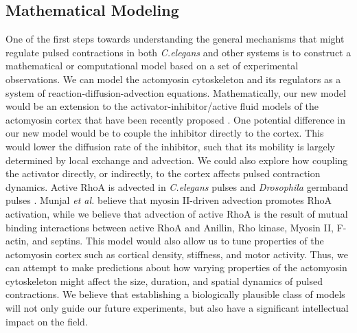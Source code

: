\documentclass{ucetd}
\begin{document}
\subsection{Mathematical Modeling} 
One of the first steps towards understanding the general mechanisms that might regulate pulsed contractions in both \textit{C.elegans} and other systems is to construct a mathematical or computational model based on a set of experimental observations.  We can model the actomyosin cytoskeleton and its regulators as a system of reaction-diffusion-advection equations.  Mathematically, our new model would be an extension to the activator-inhibitor/active fluid models of the actomyosin cortex that have been recently proposed \cite{Bois:2011kx, Kumar:2014ux}.  One potential difference in our new model would be to couple the inhibitor directly to the cortex.  This would lower the diffusion rate of the inhibitor, such that its mobility is largely determined by local exchange and advection.  We could also explore how coupling the activator directly, or indirectly, to the cortex affects pulsed contraction dynamics.  Active RhoA is advected in \textit{C.elegans} pulses and \textit{Drosophila} germband pulses \cite{Munjal:2015bx}.  Munjal \textit{et al.} believe that myosin II-driven advection promotes RhoA activation, while we believe that advection of active RhoA is the result of mutual binding interactions between active RhoA and Anillin, Rho kinase, Myosin II, F-actin, and septins.  This model would also allow us to tune properties of the actomyosin cortex such as cortical density, stiffness, and motor activity.  Thus, we can attempt to make predictions about how varying properties of the actomyosin cytoskeleton might affect the size, duration, and spatial dynamics of pulsed contractions.  We believe that establishing a biologically plausible class of models will not only guide our future experiments, but also have a significant intellectual impact on the field.
				
\end{document}
